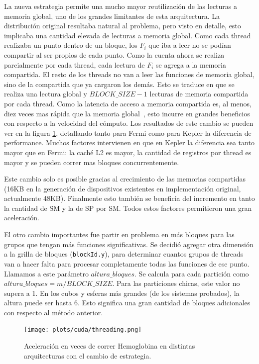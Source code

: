 La nueva estrategia permite una mucho mayor reutilizaci\'on de las lecturas a memoria
global, uno de los grandes limitantes de esta arquitectura.
La distribuci\'on original resultaba natural al problema, pero visto en detalle, esto
implicaba una cantidad elevada de lecturas a memoria global. Como cada thread realizaba un
punto dentro de un bloque, los $F_i$ que iba a leer no se pod\'ian compartir al ser
propios de cada punto. Como la cuenta ahora se realiza parcialmente por cada thread,
cada lectura de $F_i$ se agrega a la memoria compartida. El resto de los threads no van
a leer las funciones  de memoria global, sino de la compartida que ya cargaron los dem\'as. Esto
se traduce en que se realiza una lectura global y $BLOCK\_SIZE-1$ lecturas
de memoria compartida por cada thread. Como la latencia de acceso a memoria compartida
es, al menos, diez veces mas r\'apida que la memoria global~\cite{Demystifying}, esto incurre en grandes
beneficios con respecto a la velocidad del c\'omputo. Los resultados de este cambio se pueden
ver en la figura \ref{fig:threading}, detallando tanto para Fermi como para Kepler la diferencia
de performance. Muchos factores intervienen en que en Kepler la diferencia sea tanto mayor que
en Fermi: la cach\'e L2 es mayor, la cantidad de registros por thread es mayor y se pueden correr mas
bloques concurrentemente.

Este cambio solo es posible gracias al crecimiento de las memorias compartidas (16KB en la generaci\'on de
dispositivos existentes en implementaci\'on original, actualmente 48KB). Finalmente
esto tambi\'en se beneficia del incremento en tanto la cantidad de SM y la de SP por
SM. Todos estos factores permitieron una gran aceleraci\'on.

El otro cambio importantes fue partir en problema en m\'as bloques para las grupos que tengan
m\'as funciones significativas. Se decidi\'o agregar otra dimensi\'on a la grilla de bloques (\texttt{blockId.y}),
para determinar cuantos grupos de threads van a hacer falta para procesar completamente
todas las funciones de ese punto. Llamamos a este par\'ametro $altura\_bloques$. Se
calcula para cada partici\'on como $altura\_bloques = {m}/{BLOCK\_SIZE}$.
Para las particiones chicas, este valor no supera a 1. En los cubos y esferas m\'as
grandes (de los sistemas probados), la altura puede ser hasta 6. Esto significa una gran
cantidad de bloques adicionales con respecto al m\'etodo anterior.

\begin{figure}[htbp]
   \centering
   \texttt{[image: plots/cuda/threading.png]}
   \caption{Aceleraci\'on en veces de correr Hemoglobina en distintas arquitecturas con el cambio de estrategia.}
   \label{fig:threading}
\end{figure}

